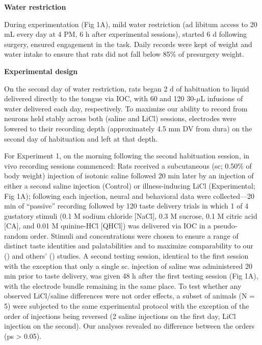 \begin{refsection}
\smallskip
\noindent\textbf{Water restriction}\par
\noindent 
During experimentation (Fig 1A), mild water restriction (ad libitum access to 20 mL every day at 4 PM, 6 h after experimental sessions), started 6 d following surgery, ensured engagement in the task. Daily records were kept of weight and water intake to ensure that rats did not fall below 85\% of presurgery weight.

\smallskip
\noindent\textbf{Experimental design}\par
\noindent 
On the second day of water restriction, rats began 2 d of habituation to liquid delivered directly to the tongue via IOC, with 60 and 120 30-\(\mu\)L infusions of water delivered each day, respectively. To maximize our ability to record from neurons held stably across both (saline and LiCl) sessions, electrodes were lowered to their recording depth (approximately 4.5 mm DV from dura) on the second day of habituation and left at that depth.

For Experiment 1, on the morning following the second habituation session, in vivo recording sessions commenced: Rats received a subcutaneous (sc; 0.50\% of body weight) injection of isotonic saline followed 20 min later by an injection of either a second saline injection (Control) or illness-inducing LiCl (Experimental; Fig 1A); following each injection, neural and behavioral data were collected—20 min of “passive” recording followed by 120 taste delivery trials in which 1 of 4 gustatory stimuli (0.1 M sodium chloride [NaCl], 0.3 M sucrose, 0.1 M citric acid [CA], and 0.01 M quinine-HCl [QHCl]) was delivered via IOC in a pseudo-random order. Stimuli and concentrations were chosen to ensure a range of distinct taste identities and palatabilities and to maximize comparability to our (\cite{grossman2008a,levitan2019a,moran2014a,sadacca2012a}) and others’ (\cite{spector1988a,samuelsen2012a}) studies. A second testing session, identical to the first session with the exception that only a single sc. injection of saline was administered 20 min prior to taste delivery, was given 48 h after the first testing session (Fig 1A), with the electrode bundle remaining in the same place. To test whether any observed LiCl/saline differences were not order effects, a subset of animals (N = 5) were subjected to the same experimental protocol with the exception of the order of injections being reversed (2 saline injections on the first day, LiCl injection on the second). Our analyses revealed no difference between the orders (ps > 0.05).


\end{refsection}
